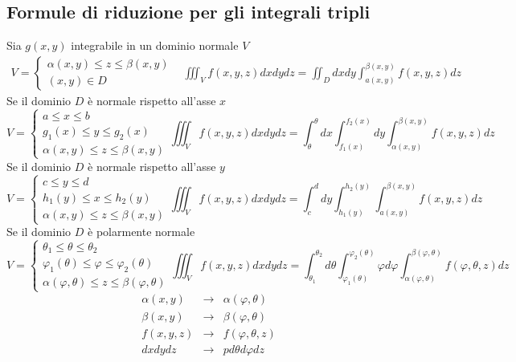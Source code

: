\subsection{Formule di riduzione per gli integrali tripli}
Sia $g(x,y)$ integrabile in un dominio normale $V$
\begin{equation*}
  \begin{matrix}
    V=\begin{cases}
        \alpha (x,y) \leq z\leq \beta (x,y)\\
        (x,y)\in D
      \end{cases} & \iiint_V f(x,y,z) dxdydz = \iint_D dxdy \displaystyle\int_{a(x,y)}^{\beta (x,y)} f(x,y,z)dz
  \end{matrix}
\end{equation*}
Se il dominio $D$ è normale rispetto all'asse $x$
\begin{equation*}
	V=\begin{cases}
		a\leq x\leq b\\
		g_1(x)\leq y\leq g_2(x)\\
		\alpha (x,y) \leq z \leq \beta (x,y)
	\end{cases} \iiint_V f(x,y,z) dxdydz = \int_\theta^\theta dx
	\int_{f_1(x)}^{f_2(x)}dy\int_{\alpha(x,y)}^{\beta(x,y)}f(x,y,z)dz
\end{equation*}
Se il dominio $D$ è normale rispetto all'asse $y$
\begin{equation*}
	V=\begin{cases}
		c\leq y \leq d\\
		h_1(y)\leq x \leq h_2(y)\\
		\alpha (x,y) \leq z \leq \beta(x,y)
	\end{cases} \iiint_V f(x,y,z) dxdydz = \int_c^d dy
	\int_{h_1(y)}^{h_2(y)}\int_{a(x,y)}^{\beta(x,y)} f(x,y,z) dz
\end{equation*}
Se il dominio $D$ è polarmente normale
\begin{equation*}
	V=\begin{cases}
		\theta_1\leq \theta \leq \theta_2\\
		\varphi_1(\theta)\leq \varphi \leq \varphi_2(\theta)\\
		\alpha (\varphi,\theta)\leq z \leq \beta(\varphi,\theta)
	\end{cases} \iiint_V f(x,y,z)dxdydz=\int_{\theta_1}^{\theta_2}d\theta
	\int^{\varphi_2(\theta)}_{\varphi_1(\theta)} \varphi d \varphi
	\int^{\beta(\varphi, \theta)}_{\alpha (\varphi,\theta)}
	f(\varphi,\theta,z)dz 
\end{equation*}
\begin{equation*}
	\begin{matrix}
		\alpha(x,y)&\to&\alpha (\varphi, \theta)\\
		\beta (x,y)&\to& \beta(\varphi, \theta)\\
		f(x,y,z) &\to & f(\varphi,\theta, z)\\
		dxdydz &\to & pd\theta d\varphi dz
	\end{matrix}
\end{equation*}
\clearpage
